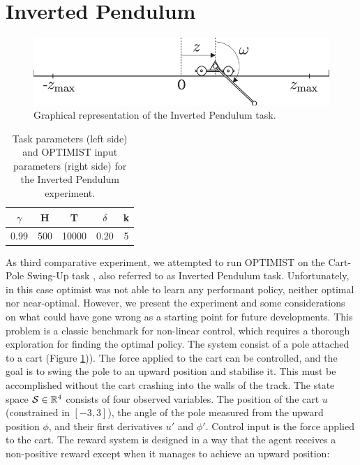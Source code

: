 
\section{Inverted Pendulum}

\begin{figure}[t!] 
\centering
\includegraphics[width=.8\textwidth,keepaspectratio]{Images/inverted_pendulum.png}
\caption{Graphical representation of the Inverted Pendulum task.} 
\label{fig:invpend}
\end{figure} 

\begin{table}
\centering
\begin{tabular}{ccc|cc} 
\toprule
$\gamma$ & H & T & $\delta$ & k\\ 
\midrule
0.99 & 500 & 10000 & 0.20 & 5\\
\bottomrule
\end{tabular}
\caption{Task parameters (left side) and \gls{OPTIMIST} input parameters (right side) for the Inverted Pendulum experiment.}
\label{tab:IPcoeff}
\end{table}

As third comparative experiment, we attempted to run \gls{OPTIMIST} on the Cart-Pole Swing-Up task \cite{tornio2006variational}, also referred to as Inverted Pendulum task. Unfortunately, in this case optimist was not able to learn any performant policy, neither optimal nor near-optimal. However, we present the experiment and some considerations on what could have gone wrong as a starting point for future developments.
This problem is a classic benchmark for non-linear control, which requires a thorough exploration for finding the optimal policy. The system consist of a pole attached to a cart (Figure \ref{fig:invpend})). The force applied to the cart can be controlled, and the goal is to swing the pole to an  upward  position  and  stabilise  it.  This  must  be accomplished without the cart crashing into the walls of the track. The state space $\mathcal{S}\in\mathbb{R}^4$ consists of four observed variables. The position of the cart $u$ (constrained in $[-3,3]$), the angle  of  the  pole  measured  from  the upward  position $\phi$,  and  their  first  derivatives $u'$ and $\phi'$.  Control input is the force applied to the cart. The reward system is designed in a way that the agent receives a non-positive reward except when it manages to achieve an upward position:

